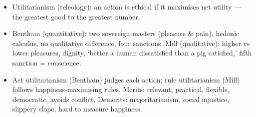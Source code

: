 \begin{QuickRevision}
\begin{itemize}
\item Utilitarianism (teleology): an action is ethical if it maximises net utility --- the greatest good to the greatest number.
\item Bentham (quantitative): two sovereign masters (pleasure \& pain), hedonic calculus, no qualitative difference, four sanctions. Mill (qualitative): higher vs lower pleasures, dignity, `better a human dissatisfied than a pig satisfied,' fifth sanction = conscience.
\item Act utilitarianism (Bentham) judges each action; rule utilitarianism (Mill) follows happiness-maximising rules. Merits: relevant, practical, flexible, democratic, avoids conflict. Demerits: majoritarianism, social injustice, slippery slope, hard to measure happiness.
\end{itemize}
\end{QuickRevision}
